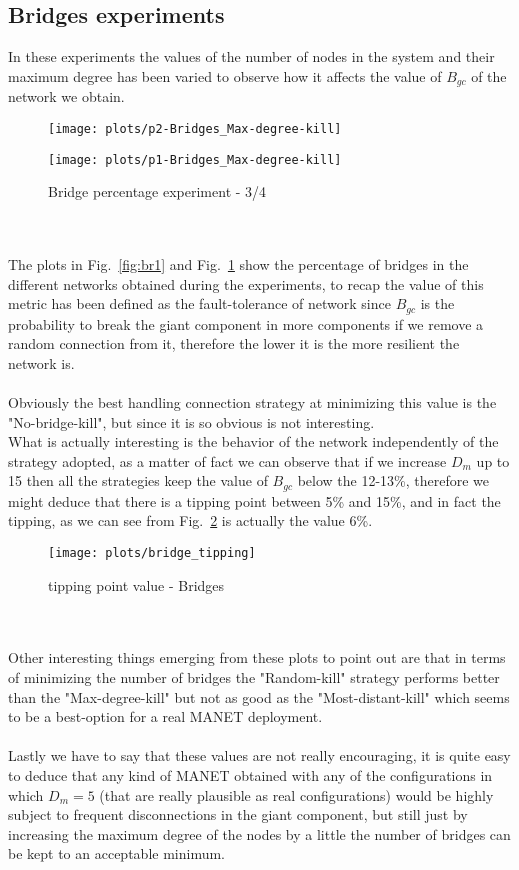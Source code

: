 \documentclass{llncs}
\begin{document}
\subsection{Bridges experiments}
In these experiments the values of the number of nodes in the system and their maximum degree has been varied to observe how it affects the value of $B_{gc}$ of the network we obtain.
\begin{figure}[h!]
	\begin{minipage}{0.5\textwidth}
		\texttt{[image: plots/p2-Bridges\_Max-degree-kill]}
		\caption{Bridge percentage - 1/2}
		\label{fig:br1}
	\end{minipage}\hfill
	\begin{minipage}{0.5\textwidth}
		\centering
		\texttt{[image: plots/p1-Bridges\_Max-degree-kill]}
		\caption{Bridge percentage experiment - 3/4}
		\label{fig:br2}
	\end{minipage}
\end{figure}
%
\\\\
The plots in Fig.~\ref{fig:br1} and Fig.~\ref{fig:br2} show the percentage of bridges in the different networks obtained during the experiments, to recap the value of this metric has been defined as the fault-tolerance of network since $B_{gc}$ is the probability to break the giant component in more components if we remove a random connection from it, therefore the lower it is the more resilient the network is.
\\\\
Obviously the best handling connection strategy at minimizing this value is the "No-bridge-kill", but since it is so obvious is not interesting.\\
What is actually interesting is the behavior of the network independently of the strategy adopted, as a matter of fact we can observe that if we increase $D_{m}$ up to 15 then all the strategies keep the value of $B_{gc}$ below the 12-13\%, therefore we might deduce that there is a tipping point between 5\% and 15\%, and in fact the tipping, as we can see from Fig.~\ref{fig:tip1} is actually the value 6\%.
\begin{figure}[h!]
	\centering
	\texttt{[image: plots/bridge\_tipping]}
	\caption{tipping point value - Bridges}
	\label{fig:tip1}
\end{figure}
\\\\
Other interesting things emerging from these plots to point out are that in terms of minimizing the number of bridges the "Random-kill" strategy performs better than the "Max-degree-kill" but not as good as the "Most-distant-kill" which seems to be a best-option for a real MANET deployment.
\\\\
Lastly we have to say that these values are not really encouraging, it is quite easy to deduce that any kind of MANET obtained with any of the configurations in which $D_{m}=5$ (that are really plausible as real configurations) would be highly subject to frequent disconnections in the giant component, but still just by increasing the maximum degree of the nodes by a little the number of bridges can be kept to an acceptable minimum.
%
%
\end{document}
